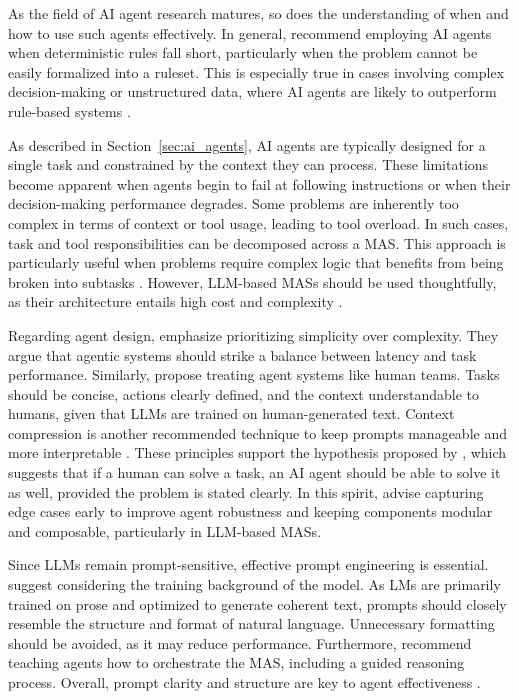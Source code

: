 \documentclass[a4paper,oneside,bibliography=totoc]{scrbook}
\begin{document}
As the field of \ac{AI} agent research matures, so does the understanding of when and how to use such agents effectively. In general, \citet{OpenAI2025} recommend employing \ac{AI} agents when deterministic rules fall short, particularly when the problem cannot be easily formalized into a ruleset. This is especially true in cases involving complex decision-making or unstructured data, where \ac{AI} agents are likely to outperform rule-based systems \cite{OpenAI2025}.

As described in Section~\ref{sec:ai_agents}, \ac{AI} agents are typically designed for a single task and constrained by the context they can process. These limitations become apparent when agents begin to fail at following instructions or when their decision-making performance degrades. Some problems are inherently too complex in terms of context or tool usage, leading to tool overload. In such cases, task and tool responsibilities can be decomposed across a \ac{MAS}. This approach is particularly useful when problems require complex logic that benefits from being broken into subtasks \cite{OpenAI2025,LangChain2025b}. However, \ac{LLM}-based \acp{MAS} should be used thoughtfully, as their architecture entails high cost and complexity \cite{Hadfield2025}.

Regarding agent design, \citet{Anthropic2024} emphasize prioritizing simplicity over complexity. They argue that agentic systems should strike a balance between latency and task performance. Similarly, \citet{Hadfield2025} propose treating agent systems like human teams. Tasks should be concise, actions clearly defined, and the context understandable to humans, given that \acp{LLM} are trained on human-generated text. Context compression is another recommended technique to keep prompts manageable and more interpretable \cite{Hadfield2025}. These principles support the hypothesis proposed by \citet{Anthropic2024}, which suggests that if a human can solve a task, an \ac{AI} agent should be able to solve it as well, provided the problem is stated clearly. In this spirit, \citet{OpenAI2025} advise capturing edge cases early to improve agent robustness and keeping components modular and composable, particularly in \ac{LLM}-based \acp{MAS}.

Since \acp{LLM} remain prompt-sensitive, effective prompt engineering is essential. \citet{Anthropic2024} suggest considering the training background of the model. As \acp{LM} are primarily trained on prose and optimized to generate coherent text, prompts should closely resemble the structure and format of natural language. Unnecessary formatting should be avoided, as it may reduce performance. Furthermore, \citet{Hadfield2025} recommend teaching agents how to orchestrate the \ac{MAS}, including a guided reasoning process. Overall, prompt clarity and structure are key to agent effectiveness \cite{OpenAI2025}.
\end{document}
